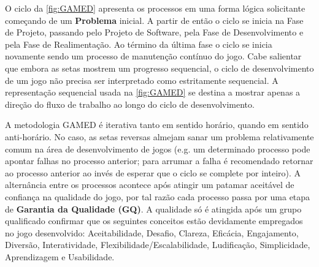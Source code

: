 O ciclo da \autoref{fig:GAMED} apresenta os processos em uma forma lógica solicitante começando de um \textbf{Problema} inicial. A partir de então o ciclo se inicia na Fase de Projeto, passando pelo Projeto de Software, pela Fase de Desenvolvimento e pela Fase de Realimentação. Ao término da última fase o ciclo se inicia novamente sendo um processo de manutenção contínuo do jogo. Cabe salientar que embora as setas mostrem um progresso sequencial, o ciclo de desenvolvimento de um jogo não precisa ser interpretado como estritamente sequencial. A representação sequencial usada na \autoref{fig:GAMED} se destina a mostrar apenas a direção do fluxo de trabalho ao longo do ciclo de desenvolvimento. 

A metodologia GAMED é iterativa tanto em sentido horário, quando em sentido anti-horário. No caso, as setas reversas almejam sanar um problema relativamente comum na área de desenvolvimento de jogos (e.g. um determinado processo pode apontar falhas no processo anterior; para arrumar a falha é recomendado retornar ao processo anterior ao invés de esperar que o ciclo se complete por inteiro). A alternância entre os processos acontece após atingir um patamar aceitável de confiança na qualidade do jogo, por tal razão cada processo passa por uma etapa de \textbf{Garantia da Qualidade (GQ)}. A qualidade só é atingida após um grupo qualificado confirmar que os seguintes conceitos estão devidamente empregados no jogo desenvolvido: Aceitabilidade, Desafio, Clareza, Eficácia, Engajamento, Diversão, Interatividade, Flexibilidade/Escalabilidade, Ludificação, Simplicidade, Aprendizagem e Usabilidade. 





\vspace{-0.2cm}

